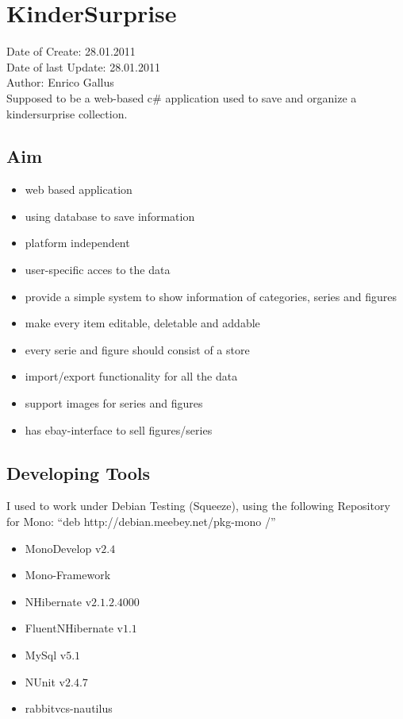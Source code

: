 \documentclass{article}
\begin{document}
\section{KinderSurprise}

Date of Create: 28.01.2011\\
Date of last Update: 28.01.2011\\
Author: Enrico Gallus\\

Supposed to be a web-based c\# application used to save and organize a
kindersurprise collection. 
\subsection{Aim}
\begin{itemize}
  \item web based application
  \item using database to save information
  \item platform independent
  \item user-specific acces to the data
  \item provide a simple system to show information of categories, series and
  figures
  \item make every item editable, deletable and addable
  \item every serie and figure should consist of a store
  \item import/export functionality for all the data
  \item support images for series and figures
  \item has ebay-interface to sell figures/series
\end{itemize}

\subsection{Developing Tools}
I used to work under Debian Testing (Squeeze), using the following Repository
for Mono: ``deb http://debian.meebey.net/pkg-mono /''

\begin{itemize}
  \item MonoDevelop v$2.4$
  \item Mono-Framework
  \item NHibernate v$2.1.2.4000$
  \item FluentNHibernate v$1.1$
  \item MySql v$5.1$
  \item NUnit v$2.4.7$
  \item rabbitvcs-nautilus
\end{itemize}
\end{document}
